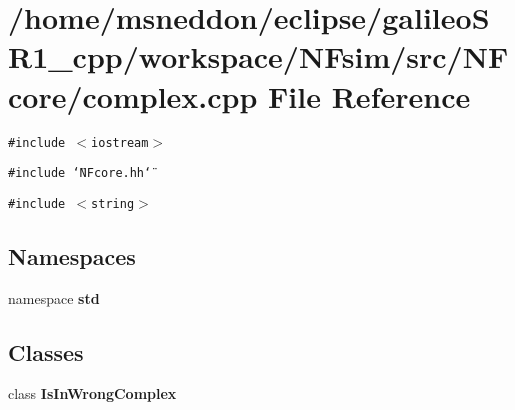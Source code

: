 \section{/home/msneddon/eclipse/galileoSR1\_\-cpp/workspace/NFsim/src/NFcore/complex.cpp File Reference}
\label{complex_8cpp}


{\tt \#include $<$iostream$>$}\par
{\tt \#include \char`\"{}NFcore.hh\char`\"{}}\par
{\tt \#include $<$string$>$}\par
\subsection*{Namespaces}
\begin{CompactItemize}
\item 
namespace {\bf std}
\end{CompactItemize}
\subsection*{Classes}
\begin{CompactItemize}
\item 
class {\bf IsInWrongComplex}
\end{CompactItemize}
